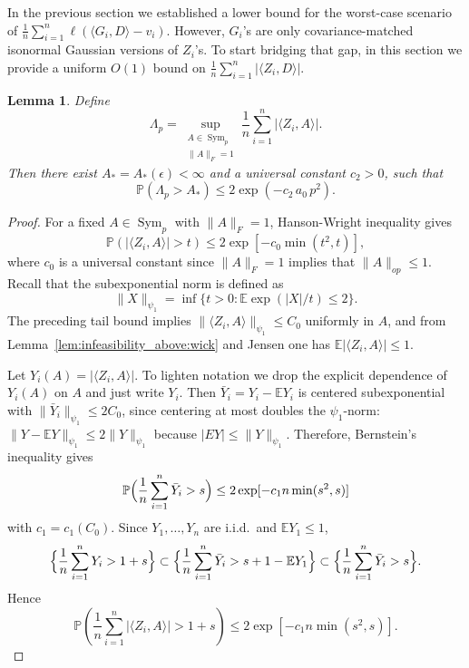 \documentclass[11pt]{article}
\numberwithin{equation}{section}
\newtheorem{lemma}[theorem]{Lemma}
\theoremstyle{definition}
\theoremstyle{remark}
\newcommand{\E}{\mathbb E}
\newcommand{\Pp}{\mathbb P}
\newcommand{\1}{\boldsymbol 1}
\begin{document}
\begin{aiblock}
In the previous section we established a lower bound for the worst-case scenario of $\frac{1}{n} \sum_{i = 1}^n \ell(\langle G_i, D\rangle - v_i)$.
However, $G_i$'s are only covariance-matched isonormal Gaussian versions of $Z_i$'s.
To start bridging that gap, in this section we provide a uniform $O(1)$ bound on $\frac{1}{n} \sum_{i = 1}^n |\langle Z_i, D \rangle|$.

\begin{lemma} \label{lem:infeasibility_above:average_z_bound}
    Define
    \[
        \Lambda_p = \sup_{\substack{A \in \operatorname{Sym}_p \\ \|A\|_F = 1}} \frac{1}{n} \sum_{i = 1}^n |\langle Z_i, A \rangle|.
    \]
    Then there exist $A_* = A_*(\epsilon) < \infty$ and a universal constant $c_2 > 0$, such that
    \[
        \Pp(\Lambda_p > A_*) \le 2 \exp(-c_2 \, a_0 \, p^2).
    \]
\end{lemma}


\begin{proof}
    For a fixed $A \in \operatorname{Sym}_p$ with $\|A\|_F=1$, Hanson-Wright inequality gives
    \[
        \Pp(|\langle Z_i, A \rangle| > t) \le 2 \exp[-c_0 \min(t^2, t)],
    \]
    where $c_0$ is a universal constant since $\|A\|_F = 1$ implies that $\|A\|_{op} \le 1$.
    Recall that the subexponential norm is defined as
    \[
        \|X\|_{\psi_1} = \inf\{t > 0 : \E\exp(|X| / t) \le 2\}.
    \]
    The preceding tail bound implies $\|\langle Z_i, A \rangle\|_{\psi_1} \le C_0$ uniformly in $A$, and from Lemma~\ref{lem:infeasibility_above:wick} and Jensen one has $\E|\langle Z_i, A \rangle| \le 1$.
    
    Let $Y_{i}(A) = |\langle Z_{i}, A \rangle|$. To lighten notation we drop the explicit dependence of $Y_i(A)$ on $A$ and just write $Y_i$.
    Then $\bar Y_{i} = Y_{i} - \E Y_{i}$ is centered subexponential with $\|\bar Y_{i}\|_{\psi_{1}} \le 2 C_{0}$, since centering at most doubles the $\psi_1$-norm: $\|Y - \E Y\|_{\psi_1} \le 2 \|Y\|_{\psi_1}$ because $|EY| \le \|Y\|_{\psi_1}$.
    Therefore, Bernstein's inequality \cite[Theorem 2.8.1]{Vershynin2018} gives
    \[
        \Pp\Bigl(\frac{1}{n} \sum_{i = 1}^n \bar Y_{i} > s\Bigr) \le 2 \exp[-c_{1} n \min(s^2, s)]
    \]
    with $c_{1} = c_{1}(C_{0})$. Since $Y_1, \dots, Y_n$ are i.i.d.\ and $\E Y_{1} \le 1$,
    \[
        \Bigl\{\frac{1}{n} \sum_{i = 1}^n Y_{i} > 1 + s \Bigr\} \subset
        \Bigl\{\frac{1}{n} \sum_{i = 1}^n \bar Y_{i} > s + 1 - \E Y_{1} \Bigr\} \subset
        \Bigl\{\frac{1}{n} \sum_{i = 1}^n \bar Y_{i} > s \Bigr\}.
    \]
    Hence
    \[
        \Pp\left(\frac{1}{n} \sum_{i = 1}^n| \langle Z_i, A\rangle| > 1 + s\right) \le 2 \exp[-c_1 n \min(s^2, s)].
    \]
    

\end{proof}
\end{aiblock}
\end{document}
